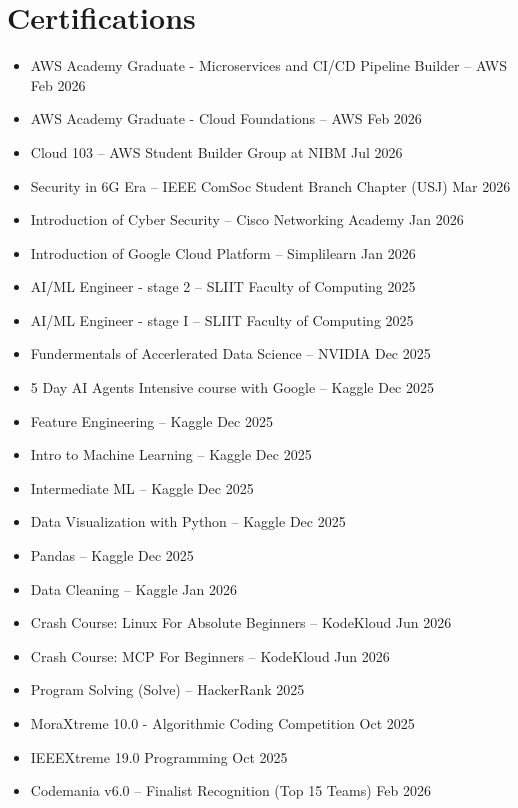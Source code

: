 \documentclass[a4paper,11pt]{article}
\begin{document}
\section*{Certifications}
\begin{itemize}
    \item AWS Academy Graduate - Microservices and CI/CD Pipeline Builder -- AWS \hfill Feb 2026
    \item AWS Academy Graduate - Cloud Foundations -- AWS \hfill Feb 2026
    \item Cloud 103 -- AWS Student Builder Group at NIBM \hfill Jul 2026
    \item Security in 6G Era -- IEEE ComSoc Student Branch Chapter (USJ) \hfill Mar 2026
    \item Introduction of Cyber Security -- Cisco Networking Academy \hfill Jan 2026
    \item Introduction of Google Cloud Platform -- Simplilearn \hfill Jan 2026
    \item AI/ML Engineer - stage 2 -- SLIIT Faculty of Computing \hfill 2025
    \item AI/ML Engineer - stage I -- SLIIT Faculty of Computing \hfill 2025
    \item Fundermentals of Accerlerated Data Science -- NVIDIA \hfill Dec 2025
    \item 5 Day AI Agents Intensive course with Google -- Kaggle \hfill Dec 2025
    \item Feature Engineering -- Kaggle \hfill Dec 2025
    \item Intro to Machine Learning -- Kaggle \hfill Dec 2025
    \item Intermediate ML -- Kaggle \hfill Dec 2025
    \item Data Visualization with Python -- Kaggle \hfill Dec 2025
    \item Pandas -- Kaggle \hfill Dec 2025
    \item Data Cleaning -- Kaggle \hfill Jan 2026
    \item Crash Course: Linux For Absolute Beginners -- KodeKloud \hfill Jun 2026
    \item Crash Course: MCP For Beginners -- KodeKloud \hfill Jun 2026
    \item Program Solving (Solve) -- HackerRank \hfill 2025
    \item MoraXtreme 10.0 - Algorithmic Coding Competition \hfill Oct 2025
    \item IEEEXtreme 19.0 Programming \hfill Oct 2025
    \item Codemania v6.0 -- Finalist Recognition (Top 15 Teams) \hfill Feb 2026

\end{itemize}
\end{document}
